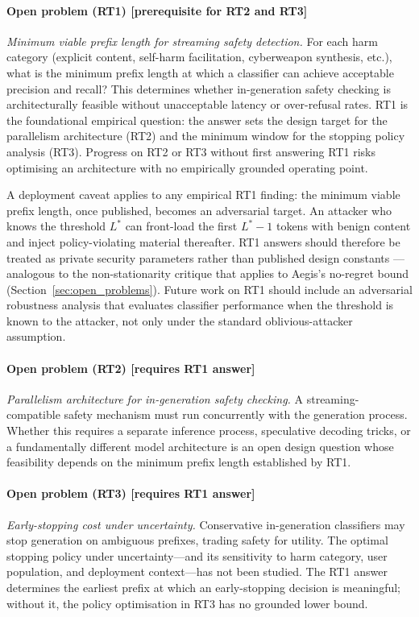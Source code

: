 \paragraph{Open problem (RT1) \textnormal{[prerequisite for RT2 and RT3]}}
\textit{Minimum viable prefix length for streaming safety detection.}
For each harm category (explicit content, self-harm facilitation, cyberweapon
synthesis, etc.), what is the minimum prefix length at which a classifier can
achieve acceptable precision and recall?
This determines whether in-generation safety checking is architecturally feasible
without unacceptable latency or over-refusal rates.
RT1 is the foundational empirical question: the answer sets the design target for
the parallelism architecture (RT2) and the minimum window for the stopping policy
analysis (RT3).
Progress on RT2 or RT3 without first answering RT1 risks optimising an architecture
with no empirically grounded operating point.

A deployment caveat applies to any empirical RT1 finding: the minimum viable prefix length, once published, becomes an adversarial target.
An attacker who knows the threshold $L^*$ can front-load the first $L^* - 1$ tokens with benign content and inject policy-violating material thereafter.
RT1 answers should therefore be treated as private security parameters rather than published design constants --- analogous to the non-stationarity critique that applies to Aegis's no-regret bound (Section~\ref{sec:open_problems}).
Future work on RT1 should include an adversarial robustness analysis that evaluates classifier performance when the threshold is known to the attacker, not only under the standard oblivious-attacker assumption.

\paragraph{Open problem (RT2) \textnormal{[requires RT1 answer]}}
\textit{Parallelism architecture for in-generation safety checking.}
A streaming-compatible safety mechanism must run concurrently with the generation
process.
Whether this requires a separate inference process, speculative decoding tricks,
or a fundamentally different model architecture is an open design question whose
feasibility depends on the minimum prefix length established by RT1.

\paragraph{Open problem (RT3) \textnormal{[requires RT1 answer]}}
\textit{Early-stopping cost under uncertainty.}
Conservative in-generation classifiers may stop generation on ambiguous prefixes,
trading safety for utility.
The optimal stopping policy under uncertainty---and its sensitivity to harm category,
user population, and deployment context---has not been studied.
The RT1 answer determines the earliest prefix at which an early-stopping decision
is meaningful; without it, the policy optimisation in RT3 has no grounded lower bound.

